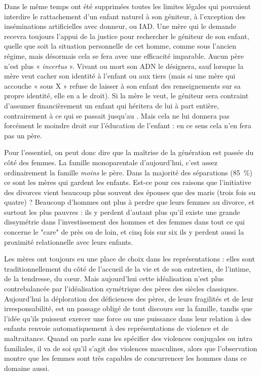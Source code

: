  Dans le même temps ont été supprimées toutes les limites légales qui pouvaient interdire le rattachement d'un enfant naturel à son géniteur, à l'exception des inséminations artificielles avec donneur, ou IAD. Une mère qui le demande recevra toujours l'appui de la justice pour rechercher le géniteur de son enfant, quelle que soit la situation personnelle de cet homme, comme sous l'ancien régime, mais désormais cela se fera avec une efficacité  imparable. Aucun père n'est plus « \emph{incertus} ». Vivant ou mort son ADN le désignera, sauf lorsque la mère veut cacher son identité à l'enfant ou aux tiers (mais si une mère qui accouche « sous X » refuse de laisser à son enfant des renseignements sur sa propre identité, elle en a le droit). Si la mère le veut, le géniteur sera contraint d'assumer financièrement un enfant qui héritera de lui à part entière, contrairement à ce qui se passait jusqu'au . Mais cela ne lui donnera pas forcément le moindre droit sur l'éducation de l'enfant : en ce sens cela n'en fera pas un père.

 Pour l'essentiel, on peut donc dire que la maîtrise de la génération est passée du côté des femmes. La famille monoparentale d'aujourd'hui, c'est assez ordinairement la famille \emph{moins} le père. Dans la majorité des séparations (85~\%) ce sont les mères qui gardent les enfants. Est-ce pour ces raisons que l'initiative des divorces vient beaucoup plus souvent des épouses que des maris (trois fois su quatre) ? Beaucoup d'hommes ont plus à perdre que leurs femmes au divorce, et surtout les plus pauvres : ils y perdent d'autant plus qu'il existe une grande dissymétrie dans l'investissement des hommes et des femmes dans tout ce qui concerne le "care" de près ou de loin, et cinq fois sur six ils y perdent aussi la proximité relationnelle avec leurs enfants. 

 Les mères ont toujours eu une place de choix dans les représentations : elles sont traditionnellement du côté de l'accueil de la vie et de son entretien, de l'intime, de la tendresse, du cœur. Mais aujourd'hui cette idéalisation n'est plus contrebalancée par l'idéalisation symétrique des pères des siècles classiques. Aujourd'hui la déploration des déficiences des pères, de leurs fragilités et de leur irresponsabilité, est un passage obligé de tout discours sur la famille, tandis que l'idée qu'ils puissent exercer une force ou une puissance dans leur relation à des enfants renvoie automatiquement à des représentations de violence et de maltraitance. Quand on parle sans les spécifier des violences conjugales ou intra familiales, il va de soi qu'il s'agit des violences masculines, alors que l'observation montre que les femmes sont très capables de concurrencer les hommes dans ce domaine aussi. 


